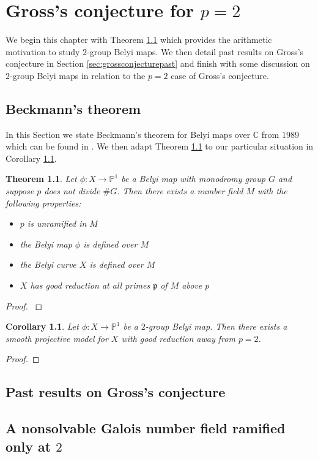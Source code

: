 \documentclass{dcthesis}
\newcommand{\PP}{\mathbb P}
\newcommand{\CC}{\mathbb C}
\numberwithin{equation}{section}
\newtheorem{theorem}[equation]{Theorem}
\newtheorem{corr}[equation]{Corollary}
\theoremstyle{definition}
\theoremstyle{remark}
\begin{document}
\chapter{Gross's conjecture for $p=2$}{\label{chapter:grossconjecture}
  We begin this chapter with Theorem \ref{thm:beckmann} which provides
  the arithmetic motivation to study $2$-group Belyi maps.
  We then detail past results on Gross's conjecture in Section
  \ref{sec:grossconjecturepast}
  and finish with some discussion on $2$-group Belyi maps
  in relation to the $p=2$ case of Gross's conjecture.
  \section{Beckmann's theorem}{\label{sec:beckmann}
    In this Section we state Beckmann's theorem
    for Belyi maps over $\CC$
    from
    $1989$ which can be found in \cite{beckmann}.
    We then adapt Theorem \ref{thm:beckmann}
    to our particular situation in
    Corollary \ref{cor:beckmann}.
    \begin{theorem}\label{thm:beckmann}
      Let $\phi:X\to\PP^1$ be a Belyi map with
      monodromy group $G$
      and suppose $p$ does not divide $\# G$.
      Then there exists a number field $M$
      with the following properties:
      \begin{itemize}
        \item
          $p$ is unramified in $M$
        \item
          the Belyi map $\phi$ is defined over $M$
        \item
          the Belyi curve $X$ is defined over $M$
        \item
          $X$ has good reduction at all primes $\mathfrak{p}$
          of $M$ above $p$
      \end{itemize}
    \end{theorem}
    \begin{proof}
      \cite{beckmann}
    \end{proof}
    \begin{corr}\label{cor:beckmann}
      Let $\phi:X\to\PP^1$ be a $2$-group Belyi map.
      Then there exists a smooth projective model for $X$
      with good reduction away from $p=2$.
    \end{corr}
    \begin{proof}
    \end{proof}
  }
  \section{Past results on Gross's conjecture}{\label{sec:grossconjecturepast}
  }
  \section{A nonsolvable Galois number field ramified only at $2$}{\label{sec:numberfieldramifiedat2}
  }
}
\end{document}
